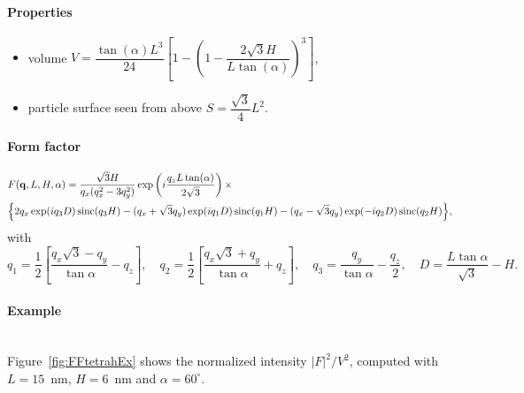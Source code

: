 \paragraph{Properties}
\begin{itemize}
\item volume $V= \dfrac{\tan(\alpha) L^3}{24} \left[1- \left(1 -
  \dfrac{2\sqrt{3} H}{L \tan(\alpha)} \right)^3\right]$,
\item particle surface seen from above $S =\dfrac{\sqrt{3}}{4}L^2$.
\end{itemize}

\paragraph{Form factor}

\begin{align*}
&F(\mathbf{q}, L, H, \alpha)=\frac{\sqrt{3}H}{q_x (q_x^2-3q_y^2)}
\exp\left(i\frac{q_z L\tan (\alpha)}{2\sqrt{3}}\right) \times \\
&\Big\{2q_x \exp(iq_3 D)\operatorname{sinc}(q_3 H) - (q_x +\sqrt{3}q_y)
\exp(iq_1 D)\operatorname{sinc}(q_1 H) -(q_x-\sqrt{3}q_y)\exp(-iq_2
D)\operatorname{sinc}(q_2 H) \Big\}, 
\end{align*}
with
\begin{equation*}
q_1  =\frac{1}{2}\left[\frac{q_x\sqrt{3} -q_y}{\tan \alpha}-q_z \right],
\quad q_2 = \frac{1}{2}\left[\frac{q_x\sqrt{3} +q_y}{\tan \alpha}+q_z
\right], \quad 
q_3 = \frac{q_y}{\tan \alpha} -\frac{q_z}{2}, \quad D = \frac{L \tan \alpha}{\sqrt{3}} -H.
\end{equation*}


\paragraph{Example}\strut\\
Figure~\ref{fig:FFtetrahEx} shows the normalized intensity
$|F|^2/V^2$, computed with $L=15$~nm, $H=6$~nm and $\alpha =60
^{\circ}$.

